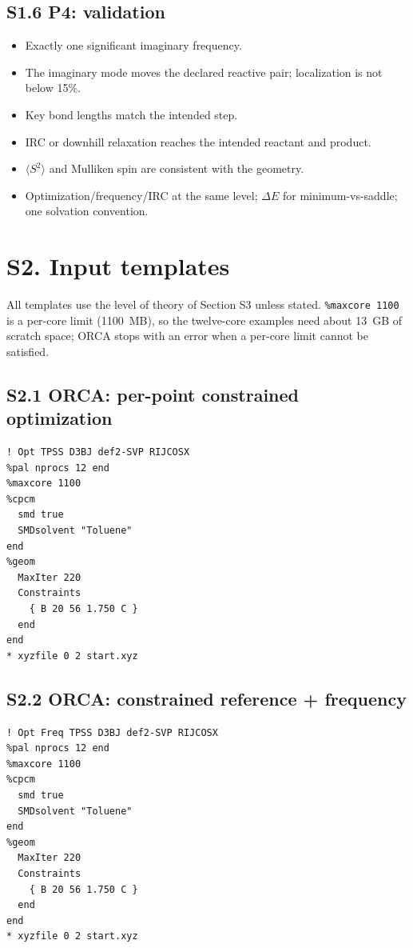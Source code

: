 \documentclass[11pt,a4paper]{article}
\begin{document}
\subsection*{S1.6 P4: validation}
\begin{itemize}
\item Exactly one significant imaginary frequency.
\item The imaginary mode moves the declared reactive pair; localization is not below 15\%.
\item Key bond lengths match the intended step.
\item IRC or downhill relaxation reaches the intended reactant and product.
\item $\langle S^2\rangle$ and Mulliken spin are consistent with the geometry.
\item Optimization/frequency/IRC at the same level; $\Delta E$ for minimum-vs-saddle; one solvation convention.
\end{itemize}

\section*{S2. Input templates}

All templates use the level of theory of Section S3 unless stated. \texttt{\%maxcore 1100} is a per-core limit (1100~MB), so the twelve-core examples need about 13~GB of scratch space; ORCA stops with an error when a per-core limit cannot be satisfied.

\subsection*{S2.1 ORCA: per-point constrained optimization}
\begin{verbatim}
! Opt TPSS D3BJ def2-SVP RIJCOSX
%pal nprocs 12 end
%maxcore 1100
%cpcm
  smd true
  SMDsolvent "Toluene"
end
%geom
  MaxIter 220
  Constraints
    { B 20 56 1.750 C }
  end
end
* xyzfile 0 2 start.xyz
\end{verbatim}

\subsection*{S2.2 ORCA: constrained reference + frequency}
\begin{verbatim}
! Opt Freq TPSS D3BJ def2-SVP RIJCOSX
%pal nprocs 12 end
%maxcore 1100
%cpcm
  smd true
  SMDsolvent "Toluene"
end
%geom
  MaxIter 220
  Constraints
    { B 20 56 1.750 C }
  end
end
* xyzfile 0 2 start.xyz
\end{verbatim}
\end{document}
